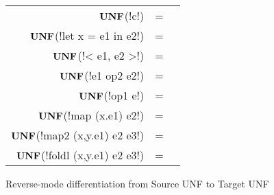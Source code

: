 \begin{figure*}[t]
    \begin{tabular}{r c l}
    $\mathbf{UNF}$(!c!) &=& \\
    $\mathbf{UNF}$(!let x = e1 in e2!) &=&  \\ 
    $\mathbf{UNF}$(!< e1, e2 >!) &=& \\ 
    $\mathbf{UNF}$(!e1 op2 e2!) &=& \\
    $\mathbf{UNF}$(!op1 e!) &=& \\
    $\mathbf{UNF}$(!map (x.e1) e2!) &=& \\
    $\mathbf{UNF}$(!map2 (x,y.e1) e2 e3!) &=& \\ 
    $\mathbf{UNF}$(!foldl (x,y.e1) e2 e3!) &=&  \\  
    \end{tabular}
    \caption{Reverse-mode differentiation from Source UNF to Target UNF}
    \label{fig:diff_macro}
    \end{figure*}